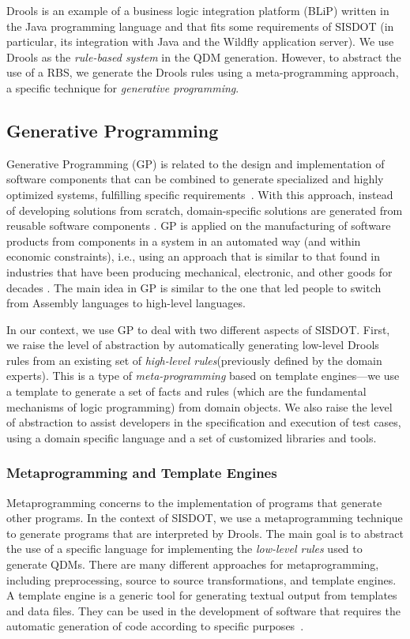 \documentclass{bmcart}
\newcommand{\callers}{\emph{high-level rules}\xspace}
\begin{document}
Drools is an example of a business logic integration platform (BLiP) written in the Java programming language and that fits some requirements of SISDOT (in particular, its integration with Java and the Wildfly application server). We use Drools as the \emph{rule-based system} in the QDM generation. However, to abstract the use of a RBS, we generate the Drools rules using a meta-programming approach, a specific technique for \emph{generative programming}. 




\subsection*{Generative Programming}
\label{sec:gp}
Generative Programming (GP) is related to the design and implementation of software components that can be combined to generate specialized and highly optimized systems, fulfilling specific requirements~\cite{DBLP:phd/dnb/Czarnecki99}. With this approach, instead of developing solutions from scratch, domain-specific solutions are generated from reusable software components \cite{arora2009}. GP is applied on the manufacturing of software products from components in a system in an automated way (and within economic constraints), i.e., using an approach that is similar to that found in industries that have been producing mechanical, electronic, and other goods for decades \cite{barth2002}. The main idea in GP is similar to the one that led people to switch from Assembly languages to high-level languages. 

In our context, we use GP to deal with two different aspects of SISDOT. First, we raise the level of abstraction by automatically generating low-level Drools rules from an existing set of \callers (previously defined by the domain experts). This is a type of \emph{meta-programming} based on template engines---we use a template to generate a set of facts and rules (which are the fundamental mechanisms of logic programming) from domain objects. We also raise the level of abstraction to assist developers in the specification and execution of test cases, using a domain specific language and a set of customized libraries and tools.  


\subsubsection*{Metaprogramming and Template Engines}
Metaprogramming concerns to the implementation of programs that generate other programs. In the context of SISDOT, we use a metaprogramming technique to generate programs that are interpreted by Drools. The main goal is to abstract the use of a specific language for implementing the \emph{low-level rules} used to generate QDMs. There are many different approaches for metaprogramming, including preprocessing, source to source transformations, and template engines. A template engine is a generic tool for generating textual output from templates and data files. They can be used in the development of software that requires the automatic generation of code according to specific purposes~\cite{benato2017}. 
\end{document}
